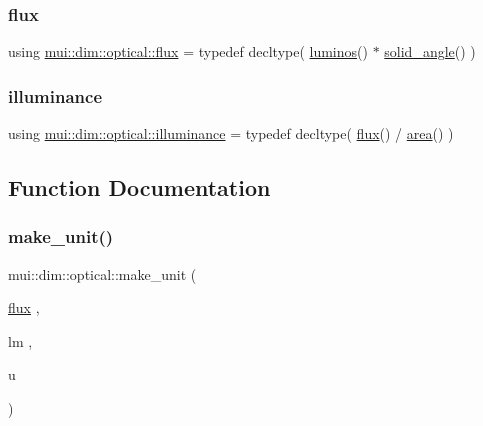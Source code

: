 \subsubsection{\texorpdfstring{flux}{flux}}
{\footnotesize\ttfamily using \hyperlink{namespacemui_1_1dim_1_1optical_a59b742e45cdd92e3759a0242d3d0b143}{mui\+::dim\+::optical\+::flux} = typedef decltype( \hyperlink{namespacemui_1_1dim_aaa6d47b51b672a8e7b7c549d6a437977}{luminos}() $\ast$ \hyperlink{namespacemui_1_1dim_a27f33f962d17ae1ee0c08c7ae835d7b8}{solid\+\_\+angle}() )}

\mbox{\label{namespacemui_1_1dim_1_1optical_a12f550275cec80470e7b6354ef378c32}} 
\subsubsection{\texorpdfstring{illuminance}{illuminance}}
{\footnotesize\ttfamily using \hyperlink{namespacemui_1_1dim_1_1optical_a12f550275cec80470e7b6354ef378c32}{mui\+::dim\+::optical\+::illuminance} = typedef decltype( \hyperlink{namespacemui_1_1dim_1_1optical_a59b742e45cdd92e3759a0242d3d0b143}{flux}() / \hyperlink{namespacemui_1_1dim_aedf0a30e04c732a032fe7e04d3260ee3}{area}() )}



\subsection{Function Documentation}
\mbox{\label{namespacemui_1_1dim_1_1optical_a949983f04a3c9e732ede62827b7cc607}} 
\subsubsection{\texorpdfstring{make\+\_\+unit()}{make\_unit()}}
{\footnotesize\ttfamily mui\+::dim\+::optical\+::make\+\_\+unit (\begin{DoxyParamCaption}\item[{\hyperlink{namespacemui_1_1dim_1_1optical_a59b742e45cdd92e3759a0242d3d0b143}{flux}}]{,  }\item[{lm}]{,  }\item[{u}]{ }\end{DoxyParamCaption})}




